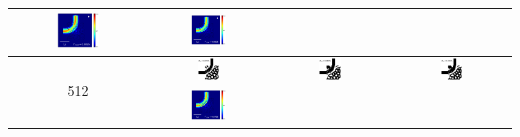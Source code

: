 \begin{table}[H]
\begin{tabular}{|c|c|c|c|}
      \includegraphics[width=0.33\textwidth]{image/results/bend/L-BFGS-B/visualize_field_disc_256.png} &
      \includegraphics[width=0.33\textwidth]{image/results/bend/L-BFGS-B/visualize_field_fab_256.png} \\
    \hline
      \multirow{2}{*}{512} &
      \includegraphics[width=0.20\textwidth]{image/results/bend/L-BFGS-B/visualize_eps_cont_512.png} &
      \includegraphics[width=0.20\textwidth]{image/results/bend/L-BFGS-B/visualize_eps_disc_512.png} &
      \includegraphics[width=0.20\textwidth]{image/results/bend/L-BFGS-B/visualize_eps_fab_512.png} \\
      \cline{2-4}
      &
      \includegraphics[width=0.33\textwidth]{image/results/bend/L-BFGS-B/visualize_field_cont_512.png} &

\end{tabular}
\end{table}
